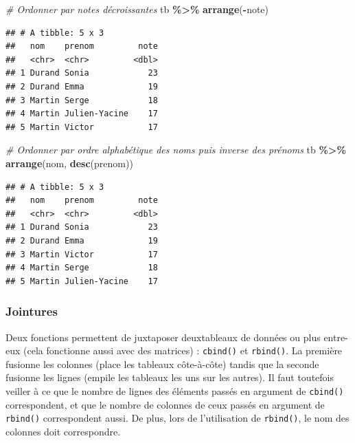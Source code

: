 \documentclass[
  11pt,
]{book}
\newenvironment{Shaded}{\begin{snugshade}}{\end{snugshade}}
\newcommand{\CommentTok}[1]{\textcolor[rgb]{0.56,0.35,0.01}{\textit{#1}}}
\newcommand{\KeywordTok}[1]{\textcolor[rgb]{0.13,0.29,0.53}{\textbf{#1}}}
\newcommand{\NormalTok}[1]{#1}
\newcommand{\OperatorTok}[1]{\textcolor[rgb]{0.81,0.36,0.00}{\textbf{#1}}}
\newcommand{\StringTok}[1]{\textcolor[rgb]{0.31,0.60,0.02}{#1}}
\numberwithin{equation}{section}
\numberwithin{countremarque}{section}
\begin{document}
\begin{Shaded}
\begin{Highlighting}[]
\CommentTok{\# Ordonner par notes décroissantes}
\NormalTok{tb }\OperatorTok{\%\textgreater{}\%}\StringTok{ }\KeywordTok{arrange}\NormalTok{(}\OperatorTok{{-}}\NormalTok{note)}
\end{Highlighting}
\end{Shaded}

\begin{lstlisting}
## # A tibble: 5 x 3
##   nom    prenom         note
##   <chr>  <chr>         <dbl>
## 1 Durand Sonia            23
## 2 Durand Emma             19
## 3 Martin Serge            18
## 4 Martin Julien-Yacine    17
## 5 Martin Victor           17
\end{lstlisting}

\begin{Shaded}
\begin{Highlighting}[]
\CommentTok{\# Ordonner par ordre alphabétique des noms puis inverse des prénoms}
\NormalTok{tb }\OperatorTok{\%\textgreater{}\%}\StringTok{ }\KeywordTok{arrange}\NormalTok{(nom, }\KeywordTok{desc}\NormalTok{(prenom))}
\end{Highlighting}
\end{Shaded}

\begin{lstlisting}
## # A tibble: 5 x 3
##   nom    prenom         note
##   <chr>  <chr>         <dbl>
## 1 Durand Sonia            23
## 2 Durand Emma             19
## 3 Martin Victor           17
## 4 Martin Serge            18
## 5 Martin Julien-Yacine    17
\end{lstlisting}

\hypertarget{jointures}{%
\subsubsection{Jointures}\label{jointures}}

Deux fonctions permettent de juxtaposer deuxtableaux de données ou plus entre-eux (cela fonctionne aussi avec des matrices) : \texttt{cbind()} et \texttt{rbind()}. La première fusionne les colonnes (place les tableaux côte-à-côte) tandis que la seconde fusionne les lignes (empile les tableaux les uns sur les autres). Il faut toutefois veiller à ce que le nombre de lignes des éléments passés en argument de \texttt{cbind()} correspondent, et que le nombre de colonnes de ceux passés en argument de \texttt{rbind()} correspondent aussi. De plus, lors de l'utilisation de \texttt{rbind()}, le nom des colonnes doit correspondre.
\end{document}
